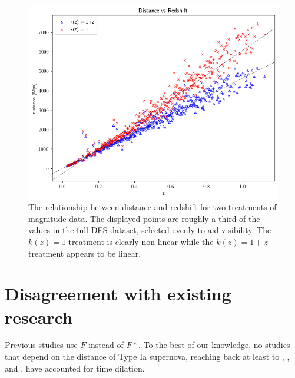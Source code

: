 \documentclass{article}
\begin{document}
\begin{figure}[h!]
  \includegraphics[width=\linewidth]{../graphs/mu_distance_vs_redshift.png}
  \caption{The relationship between distance and redshift for two treatments of
  magnitude data. The displayed points are roughly a third of the values in the
  full DES dataset, selected evenly to aid visibility. The $k(z) = 1$ treatment
  is clearly non-linear while the $k(z) = 1 + z$ treatment appears to be
  linear.}
  \label{fig:mu_distance_vs_redshift}
\end{figure}

\section{Disagreement with existing research}

Previous studies use $F$ instead of $F*$. To the best of our knowledge, no
studies that depend on the distance of Type Ia supernova, reaching back at
least to \citet{kim1996}, \citet{riess1998}, and \citet{perlmutter1999}, have
accounted for time dilation.



\end{document}
